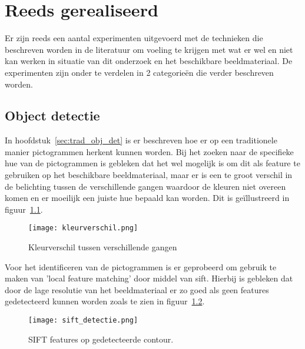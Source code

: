 
\chapter{Reeds gerealiseerd}

Er zijn reeds een aantal experimenten uitgevoerd met de technieken die beschreven worden in de literatuur om voeling te krijgen met wat er wel en niet kan werken in situatie van dit onderzoek
en het beschikbare beeldmateriaal. De experimenten zijn onder te verdelen in 2 categorie\"{e}n die verder beschreven worden.

\section{Object detectie}
   In hoofdstuk~\ref{sec:trad_obj_det} is er beschreven hoe er op een traditionele manier pictogrammen herkent kunnen worden.
   Bij het zoeken naar de specifieke hue van de pictogrammen is gebleken dat het wel mogelijk is om dit als feature te gebruiken op het beschikbare beeldmateriaal, maar
   er is een te groot verschil in de belichting tussen de verschillende gangen waardoor de kleuren niet overeen komen en er moeilijk een juiste hue bepaald kan worden.
   Dit is ge\"{i}llustreerd in figuur~\ref{fig:kleurverschil}.
   
   \begin{figure}[!htb]
      \centering
      \texttt{[image: kleurverschil.png]}
      \caption{Kleurverschil tussen verschillende gangen}
      \label{fig:kleurverschil}
   \end{figure}

   Voor het identificeren van de pictogrammen is er geprobeerd om gebruik te maken van 'local feature matching' door middel van \gls{sift}. 
   Hierbij is gebleken dat door de lage resolutie van het beeldmateriaal er zo goed als geen features gedetecteerd kunnen worden zoals te zien in figuur~\ref{fig:sift_detect}.


   \begin{figure}[!htb]
      \centering
      \texttt{[image: sift\_detectie.png]}
      \caption{SIFT features op gedetecteerde contour.}
      \label{fig:sift_detect}
   \end{figure}


